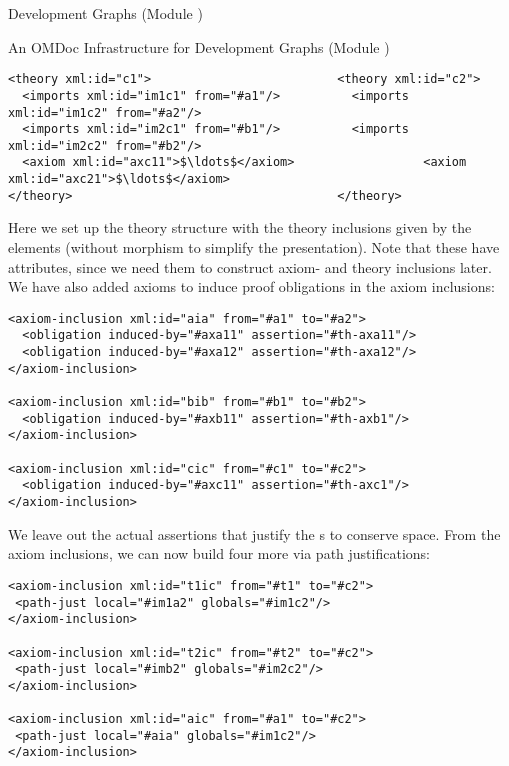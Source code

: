 \begin{omgroup}[id=complex-theories,short=Complex Theories,
                            creators=miko,contributors=frabe]
\begin{omgroup}[id=development-graphs,short=Development Graphs]{Development Graphs (Module
  {})}
\begin{module}[id=dgraph]
\begin{omgroup}[id=dg-omdoc,short=OMDoc Development Graphs]{An OMDoc Infrastructure for
  Development Graphs (Module {})}
\begin{lstlisting}[label=lst:thi,mathescape,
                   index={theory,imports,axiom},
                   caption={The \omdoc representation of the theories
                   in {\myfigref{thi-proof}}.}]
<theory xml:id="c1">                          <theory xml:id="c2">
  <imports xml:id="im1c1" from="#a1"/>          <imports xml:id="im1c2" from="#a2"/>
  <imports xml:id="im2c1" from="#b1"/>          <imports xml:id="im2c2" from="#b2"/>
  <axiom xml:id="axc11">$\ldots$</axiom>                  <axiom xml:id="axc21">$\ldots$</axiom>
</theory>                                     </theory>
\end{lstlisting}
Here we set up the theory structure with the theory inclusions given by the
 elements (without morphism to simplify the presentation). Note
that these have  attributes, since we need them to
construct axiom- and theory inclusions later. We have also added axioms to induce
proof obligations in the axiom inclusions:
\begin{lstlisting}[label=lst:thi-inclusions,
                   index={obligation,axiom-inclusion},
                   caption={The \omdoc Representation of the Inclusions
                   in {\myfigref{thi-proof}}.}]
<axiom-inclusion xml:id="aia" from="#a1" to="#a2">
  <obligation induced-by="#axa11" assertion="#th-axa11"/>
  <obligation induced-by="#axa12" assertion="#th-axa12"/>
</axiom-inclusion>

<axiom-inclusion xml:id="bib" from="#b1" to="#b2"> 
  <obligation induced-by="#axb11" assertion="#th-axb1"/>
</axiom-inclusion>

<axiom-inclusion xml:id="cic" from="#c1" to="#c2">
  <obligation induced-by="#axc11" assertion="#th-axc1"/>
</axiom-inclusion>
\end{lstlisting}
We leave out the actual assertions that justify the {s} to conserve
space. From the axiom inclusions, we can now build four more via path justifications:

\begin{lstlisting}[label=lst:thi-induced-inclusions,index={path-just,axiom-inclusion},
                   caption={The Induced Axiom Inclusions in {\myfigref{thi-proof}}.}]
<axiom-inclusion xml:id="t1ic" from="#t1" to="#c2">
 <path-just local="#im1a2" globals="#im1c2"/>
</axiom-inclusion>

<axiom-inclusion xml:id="t2ic" from="#t2" to="#c2">
 <path-just local="#imb2" globals="#im2c2"/>
</axiom-inclusion>

<axiom-inclusion xml:id="aic" from="#a1" to="#c2">
 <path-just local="#aia" globals="#im1c2"/>
</axiom-inclusion>


\end{lstlisting}
\end{omgroup}
\end{module}
\end{omgroup}
\end{omgroup}
